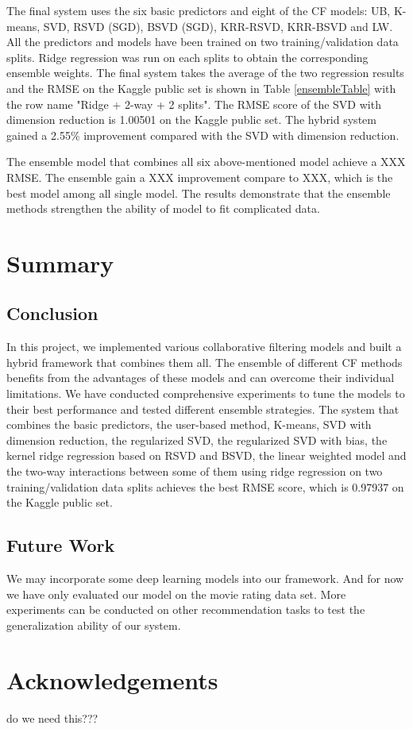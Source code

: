 \documentclass[10pt,conference,compsocconf]{IEEEtran}
\begin{document}
The final system uses the six basic predictors and eight of the CF models: UB, K-means, SVD, RSVD (SGD), BSVD (SGD), KRR-RSVD, KRR-BSVD and LW. All the predictors and models have been trained on two training/validation data splits. Ridge regression was run on each splits to obtain the corresponding ensemble weights. The final system takes the average of the two regression results and the RMSE on the Kaggle public set is shown in Table \ref{ensembleTable} with the row name "Ridge + 2-way + 2 splits". The RMSE score of the SVD with dimension reduction is 1.00501 on the Kaggle public set. The hybrid system gained a 2.55\% improvement compared with the SVD with dimension reduction.


The ensemble model that combines all six above-mentioned model achieve a XXX RMSE. The ensemble gain a XXX improvement compare to XXX, which is the best model among all single model. The results demonstrate that the ensemble methods strengthen the ability of model to fit complicated data.

\section{Summary}
\subsection{Conclusion}
In this project, we implemented various collaborative filtering models and built a hybrid framework that combines them all. The ensemble of different CF methods benefits from the advantages of these models and can overcome their individual limitations. We have conducted comprehensive experiments to tune the models to their best performance and tested different ensemble strategies. The system that combines the basic predictors, the user-based method, K-means, SVD with dimension reduction, the regularized SVD, the regularized SVD with bias, the kernel ridge regression based on RSVD and BSVD, the linear weighted model and the two-way interactions between some of them using ridge regression on two training/validation data splits achieves the best RMSE score, which is 0.97937 on the Kaggle public set.

\subsection{Future Work}
We may incorporate some deep learning models into our framework. And for now we have only evaluated our model on the movie rating data set. More experiments can be conducted on other recommendation tasks to test the generalization ability of our system.

\section*{Acknowledgements}
do we need this???



\end{document}
